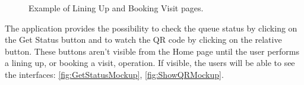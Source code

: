 \begin{figure}[H]
	\caption{Example of Lining Up and Booking Visit pages.}
	\label{fig:LiningBookingMockup}
\end{figure}

The application provides the possibility to check the queue status by clicking on the Get Status button and to watch the QR code by clicking on the relative button.
These buttons aren't visible from the Home page until the user performs a lining up, or booking a visit, operation.
If visible, the users will be able to see the interfaces: \ref{fig:GetStatusMockup}, \ref{fig:ShowQRMockup}.

